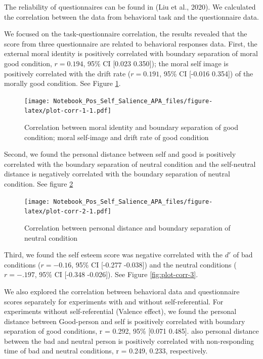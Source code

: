 \documentclass[
  english,
  man]{apa6}
\begin{document}
The reliability of questionnaires can be found in (Liu et al., 2020). We calculated the correlation between the data from behavioral task and the questionnaire data.

We focused on the task-questionnaire correlation, the results revealed that the score from three questionnaire are related to behavioral responses data.
First, the external moral identity is positively correlated with boundary separation of moral good condition, \(r = 0.194\), 95\% CI {[}0.023 0.350{]}); the moral self image is positively correlated with the drift rate (\(r = 0.191\), 95\% CI {[}-0.016 0.354{]}) of the morally good condition. See Figure \ref{fig:plot-corr-1}.

\begin{figure}
\centering
\texttt{[image: Notebook\_Pos\_Self\_Salience\_APA\_files/figure-latex/plot-corr-1-1.pdf]}
\caption{\label{fig:plot-corr-1}Correlation between moral identity and boundary separation of good condition; moral self-image and drift rate of good condition}
\end{figure}

Second, we found the personal distance between self and good is positively correlated with the boundary separation of neutral condition and the self-neutral distance is negatively correlated with the boundary separation of neutral condition. See figure \ref{fig:plot-corr-2}

\begin{figure}
\centering
\texttt{[image: Notebook\_Pos\_Self\_Salience\_APA\_files/figure-latex/plot-corr-2-1.pdf]}
\caption{\label{fig:plot-corr-2}Correlation between personal distance and boundary separation of neutral condition}
\end{figure}

Third, we found the self esteem score was negative correlated with the \(d'\) of bad conditions (\(r = -0.16\), 95\% CI {[}-0.277 -0.038{]}) and the neutral conditions (\(r = -.197\), 95\% CI {[}-0.348 -0.026{]}). See Figure \ref{fig:plot-corr-3}.

We also explored the correlation between behavioral data and questionnaire scores separately for experiments with and without self-referential. For experiments without self-referential (Valence effect), we found the personal distance between Good-person and self is positively correlated with boundary separation of good conditions, r = 0.292, 95\% {[}0.071 0.485{]}. also personal distance between the bad and neutral person is positively correlated with non-responding time of bad and neutral conditions, r = 0.249, 0.233, respectively.
\end{document}
